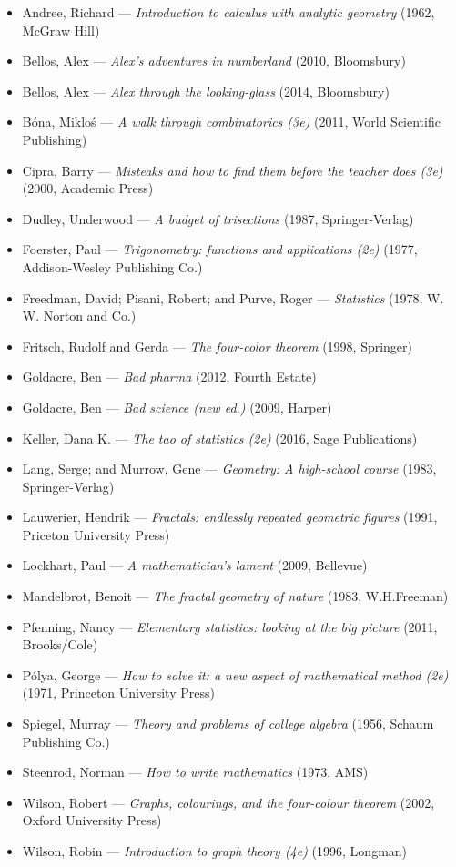 \begin{itemize}[noitemsep]
  \item Andree, Richard --- \emph{Introduction to calculus with analytic geometry} (1962, McGraw Hill)
  \item Bellos, Alex --- \emph{Alex's adventures in numberland} (2010, Bloomsbury)
  \item Bellos, Alex --- \emph{Alex through the looking-glass} (2014, Bloomsbury)
  \item B\'ona, Miklo\'s --- \emph{A walk through combinatorics (3e)} (2011, World Scientific Publishing)
  \item Cipra, Barry --- \emph{Misteaks and how to find them before the teacher does (3e)} (2000, Academic Press)
  \item Dudley, Underwood --- \emph{A budget of trisections} (1987, Springer-Verlag)
  \item Foerster, Paul --- \emph{Trigonometry: functions and applications (2e)} (1977, Addison-Wesley Publishing Co.)
  \item Freedman, David; Pisani, Robert; and Purve, Roger --- \emph{Statistics} (1978, W. W. Norton and Co.)
  \item Fritsch, Rudolf and Gerda --- \emph{The four-color theorem} (1998, Springer)
  \item Goldacre, Ben --- \emph{Bad pharma} (2012, Fourth Estate)
  \item Goldacre, Ben --- \emph{Bad science (new ed.)} (2009, Harper)
  \item Keller, Dana K. --- \emph{The tao of statistics (2e)} (2016, Sage Publications)
  \item Lang, Serge; and Murrow, Gene --- \emph{Geometry: A high-school course} (1983, Springer-Verlag)
  \item Lauwerier, Hendrik --- \emph{Fractals: endlessly repeated geometric figures} (1991, Priceton University Press)
  \item Lockhart, Paul --- \emph{A mathematician's lament} (2009, Bellevue)
  \item Mandelbrot, Benoit --- \emph{The fractal geometry of nature} (1983, W.H.Freeman)
  \item Pfenning, Nancy --- \emph{Elementary statistics: looking at the big picture} (2011, Brooks/Cole)
  \item P\'olya, George --- \emph{How to solve it: a new aspect of mathematical method (2e)} (1971, Princeton University Press)
  \item Spiegel, Murray --- \emph{Theory and problems of college algebra} (1956, Schaum Publishing Co.)
  \item Steenrod, Norman --- \emph{How to write mathematics} (1973, AMS)
  \item Wilson, Robert --- \emph{Graphs, colourings, and the four-colour theorem} (2002, Oxford University Press)
  \item Wilson, Robin --- \emph{Introduction to graph theory (4e)} (1996, Longman)
\end{itemize}


